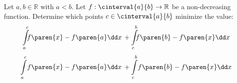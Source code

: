 Let $a, b \in \mathbb{R}$ with $a < b$.
Let $f : \cinterval{a}{b} \to \mathbb{R}$ be a non-decreasing function.
Determine which points $c \in \cinterval{a}{b}$ minimize the value:
\ifluatex
  \begin{equation*}
    \int\limits_{a}^{c} {\mspace{-9mu} f\paren{x} - f\paren{a} \dd x} \, +
    \int\limits_{c}^{b} {\mspace{-9mu} f\paren{b} - f\paren{x} \dd x}
  \end{equation*}
\else
  \begin{equation*}
    \int\limits_{a}^{c} {\mspace{-3mu} f\paren{x} - f\paren{a} \dd x} \, +
    \int\limits_{c}^{b} {\mspace{-3mu} f\paren{b} - f\paren{x} \dd x}
  \end{equation*}
\fi
